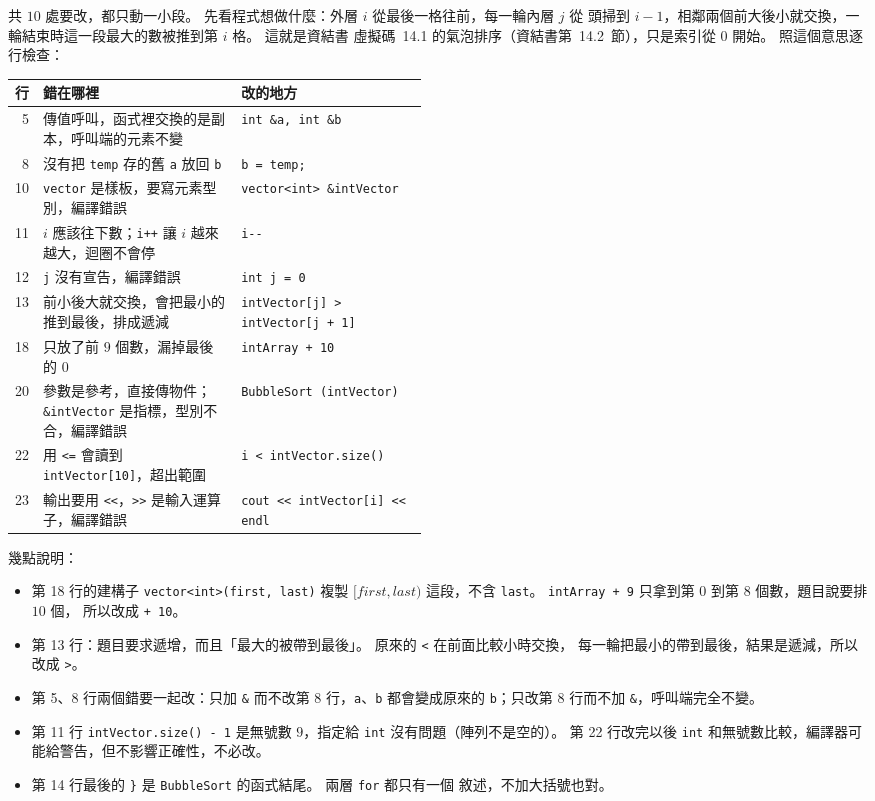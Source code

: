 \begin{pastsoln}
共 $10$ 處要改，都只動一小段。 先看程式想做什麼：外層 $i$ 從最後一格往前，每一輪內層 $j$ 從
頭掃到 $i - 1$，相鄰兩個前大後小就交換，一輪結束時這一段最大的數被推到第 $i$ 格。 這就是資結書
虛擬碼~14.1 的氣泡排序（資結書第~14.2~節），只是索引從 $0$ 開始。 照這個意思逐行檢查：

\begin{center}
\small
\begin{tabular}{rp{0.48\linewidth}l}
\toprule
行 & 錯在哪裡 & 改的地方 \\
\midrule
5 & 傳值呼叫，函式裡交換的是副本，呼叫端的元素不變 & \texttt{int \&a, int \&b} \\
8 & 沒有把 \texttt{temp} 存的舊 \texttt{a} 放回 \texttt{b} & \texttt{b = temp;} \\
10 & \texttt{vector} 是樣板，要寫元素型別，編譯錯誤 & \texttt{vector<int> \&intVector} \\
11 & $i$ 應該往下數；\texttt{i++} 讓 $i$ 越來越大，迴圈不會停 & \texttt{i-{}-} \\
12 & \texttt{j} 沒有宣告，編譯錯誤 & \texttt{int j = 0} \\
13 & 前小後大就交換，會把最小的推到最後，排成遞減 & \texttt{intVector[j] > intVector[j + 1]} \\
18 & 只放了前 $9$ 個數，漏掉最後的 $0$ & \texttt{intArray + 10} \\
20 & 參數是參考，直接傳物件；\texttt{\&intVector} 是指標，型別不合，編譯錯誤 & \texttt{BubbleSort (intVector)} \\
22 & 用 \texttt{<=} 會讀到 \texttt{intVector[10]}，超出範圍 & \texttt{i < intVector.size()} \\
23 & 輸出要用 \texttt{<<}，\texttt{>>} 是輸入運算子，編譯錯誤 & \texttt{cout << intVector[i] << endl} \\
\bottomrule
\end{tabular}
\end{center}

幾點說明：
\begin{itemize}
\item 第 18 行的建構子 \texttt{vector<int>(first, last)} 複製 $[\mathit{first}, \mathit{last})$
這段，不含 \texttt{last}。 \texttt{intArray + 9} 只拿到第 $0$ 到第 $8$ 個數，題目說要排 $10$ 個，
所以改成 \texttt{+ 10}。
\item 第 13 行：題目要求遞增，而且「最大的被帶到最後」。 原來的 \texttt{<} 在前面比較小時交換，
每一輪把最小的帶到最後，結果是遞減，所以改成 \texttt{>}。
\item 第 5、8 行兩個錯要一起改：只加 \texttt{\&} 而不改第 8 行，\texttt{a}、\texttt{b} 都會變成原來的
\texttt{b}；只改第 8 行而不加 \texttt{\&}，呼叫端完全不變。
\item 第 11 行 \texttt{intVector.size() - 1} 是無號數 $9$，指定給 \texttt{int} 沒有問題（陣列不是空的）。
第 22 行改完以後 \texttt{int} 和無號數比較，編譯器可能給警告，但不影響正確性，不必改。
\item 第 14 行最後的 \texttt{\}} 是 \texttt{BubbleSort} 的函式結尾。 兩層 \texttt{for} 都只有一個
敘述，不加大括號也對。
\end{itemize}


\end{pastsoln}
